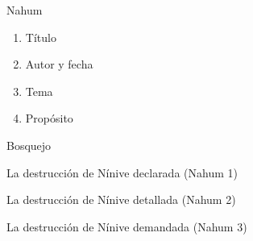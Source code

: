 \documentclass[12pt]{article}
\begin{document}
\begin{section}{Nahum}
	\begin{enumerate}
		\item Título\\

		\item Autor y fecha\\
		\item Tema\\
		\item Propósito\\
	\end{enumerate}
	\begin{subsection}{Bosquejo}
		\begin{subsubsection}{La destrucción de Nínive declarada (Nahum 1)}
		\end{subsubsection}
		\begin{subsubsection}{La destrucción de Nínive detallada (Nahum 2)}
		\end{subsubsection}
		\begin{subsubsection}{La destrucción de Nínive demandada (Nahum 3)}
		\end{subsubsection}
	\end{subsection}
\end{section}
\end{document}
